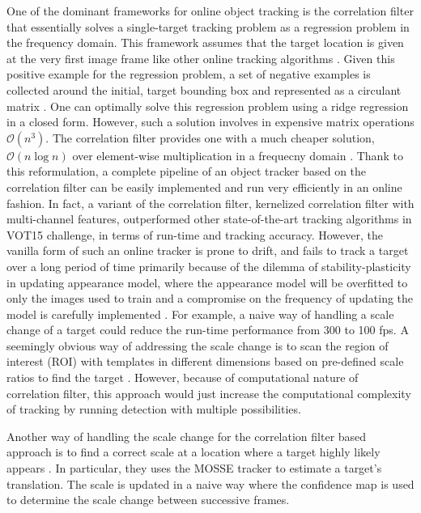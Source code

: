 \documentclass[10pt,twocolumn,letterpaper]{article}
\newcounter{ct}
\begin{document}
One of the dominant frameworks for online object tracking is the
correlation filter that essentially solves a single-target tracking
problem as a regression problem in the frequency domain. This
framework assumes that the target location is given at the very first
image frame like other online tracking algorithms
\cite{smeulders2014survey}. Given this positive example for the
regression problem, a set of negative examples is collected around the
initial, target bounding box and represented as a circulant matrix
\cite{henriques2015high}. One can optimally solve this regression
problem using a ridge regression in a closed form. However, such a
solution involves in expensive matrix operations
$\mathcal{O}(n^{3})$. The correlation filter provides one with a much
cheaper solution, $\mathcal{O}(n\log n)$ over element-wise
multiplication in a frequecny domain
\cite{bolme2010visual,henriques2015high}. Thank to this reformulation,
a complete pipeline of an object tracker based on the correlation
filter can be easily implemented and run very efficiently in an online
fashion. In fact, a variant of the correlation filter, kernelized
correlation filter with multi-channel features, outperformed other
state-of-the-art tracking algorithms in VOT15 challenge, in terms of
run-time and tracking accuracy. However, the vanilla form of such an
online tracker is prone to drift, and fails to track a target over a
long period of time primarily \cite{henriques2015high} because of the
dilemma of stability-plasticity in updating appearance model, where
the appearance model will be overfitted to only the images used to
train and a compromise on the frequency of updating the model is
carefully implemented \cite{santner2010prost}. For example, a naive
way of handling a scale change of a target could reduce the run-time
performance from 300 to 100 fps. A seemingly obvious way of addressing
the scale change is to scan the region of interest (ROI) with
templates in different dimensions based on pre-defined scale ratios to
find the target
\cite{henriques2015high,tang2015multi,ma2015long,bibi2015multi,li2014scale}. However,
because of computational nature of correlation filter, this approach
would just increase the computational complexity of tracking by
running detection with multiple possibilities. 

Another way of handling the scale change for the correlation filter
based approach is to find a correct scale at a location where a target
highly likely appears \cite{zhang2014fast}. In particular, they uses
the MOSSE tracker to estimate a target's translation. The scale is
updated in a naive way where the confidence map is used to determine
the scale change between successive frames. 
\end{document}
